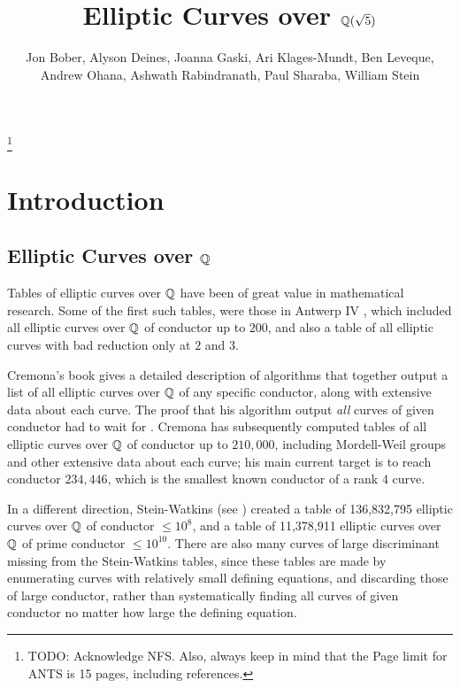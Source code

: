 \documentclass{amsart}
\title{Elliptic Curves over $\mathbb{Q}(\sqrt{5})$}
\author[Bober et al.]{Jon Bober, Alyson Deines, Joanna Gaski, Ari Klages-Mundt, Ben
  Leveque, Andrew Ohana, Ashwath Rabindranath, Paul Sharaba, William
  Stein}
\begin{document}
\begin{abstract} 
\end{abstract} 

\maketitle

\footnote{TODO: Acknowledge NFS.  Also, always keep in mind that the
  Page limit for ANTS is 15 pages, including references.}

\section{Introduction}\label{sec:intro}

\subsection{Elliptic Curves over $\mathbb{Q}$}
Tables of elliptic curves over $\mathbb{Q}$ have been of great value in
mathematical research.  Some of the first such tables, were those in
Antwerp IV \cite{antwerpiv}, which included all elliptic curves over
$\mathbb{Q}$ of conductor up to $200$, and also a table of all elliptic curves
with bad reduction only at $2$ and $3$.  

Cremona's book \cite{cremona:algs} gives a detailed
description of algorithms that together  output a list of all
elliptic curves over $\mathbb{Q}$ of any specific conductor, along with
extensive data about each curve.  The proof that his algorithm output
{\em all} curves of given conductor had to wait for
\cite{breuil-conrad-diamond-taylor}.  Cremona has subsequently
computed tables \cite{cremona:onlinetables} of all elliptic curves
over $\mathbb{Q}$ of conductor up to $210,\!000$, including Mordell-Weil
groups and other extensive data about each curve; his main current
target is to reach conductor $234,\!446$, which is the smallest known
conductor of a rank $4$ curve.

In a different direction, Stein-Watkins (see
\cite{stein-watkins:ants5, bmsw:bulletins}) created a table of
136,832,795 elliptic curves over $\mathbb{Q}$ of conductor $\leq 10^8$, and a
table of 11,378,911 elliptic curves over $\mathbb{Q}$ of prime conductor $\leq
10^{10}$. 
There are also many curves of large discriminant missing from the
Stein-Watkins tables, since these tables are made by enumerating
curves with relatively small defining equations, and discarding those
of large conductor, rather than systematically finding all curves of
given conductor no matter how large the defining equation.
\end{document}
